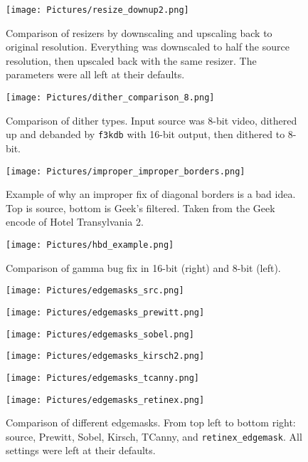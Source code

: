 \documentclass{scrartcl}
\begin{document}
\begin{figure}[h]
\centering
\texttt{[image: Pictures/resize\_downup2.png]}
\caption{Comparison of resizers by downscaling and upscaling back to original resolution.  Everything was downscaled to half the source resolution, then upscaled back with the same resizer.  The parameters were all left at their defaults.}\label{fig:21}
\end{figure}

\begin{figure}[h]
\centering
\texttt{[image: Pictures/dither\_comparison\_8.png]}
\caption{Comparison of dither types.  Input source was 8-bit video, dithered up and debanded by \texttt{f3kdb} with 16-bit output, then dithered to 8-bit.}\label{fig:12}
\end{figure}

\begin{figure}[h]
\centering
\texttt{[image: Pictures/improper\_improper\_borders.png]}
\caption{Example of why an improper fix of diagonal borders is a bad idea.  Top is source, bottom is Geek's filtered.  Taken from the Geek encode of Hotel Transylvania 2.}\label{fig:26}
\end{figure}

\begin{figure}[h]
\centering
\texttt{[image: Pictures/hbd\_example.png]}
\caption{Comparison of gamma bug fix in 16-bit (right) and 8-bit (left).}\label{fig:flvls}
\end{figure}

\begin{figure}[h]
\begin{minipage}{.5\textwidth}
\centering
\texttt{[image: Pictures/edgemasks\_src.png]}
\end{minipage}
\begin{minipage}{.5\textwidth}
\centering
\texttt{[image: Pictures/edgemasks\_prewitt.png]}
\end{minipage}
\begin{minipage}{.5\textwidth}
\centering
\texttt{[image: Pictures/edgemasks\_sobel.png]}
\end{minipage}
\begin{minipage}{.5\textwidth}
\centering
\texttt{[image: Pictures/edgemasks\_kirsch2.png]}
\end{minipage}
\begin{minipage}{.5\textwidth}
\centering
\texttt{[image: Pictures/edgemasks\_tcanny.png]}
\end{minipage}
\begin{minipage}{.5\textwidth}
\centering
\texttt{[image: Pictures/edgemasks\_retinex.png]}
\end{minipage}
\caption{Comparison of different edgemasks.  From top left to bottom right: source, Prewitt, Sobel, Kirsch, TCanny, and \texttt{retinex\_edgemask}.  All settings were left at their defaults.}\label{fig:16}
\end{figure}
\end{document}
